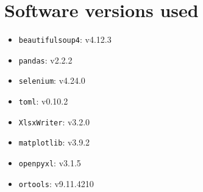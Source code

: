 \section{Software versions used}
\begin{itemize}
    \item \texttt{beautifulsoup4}: v4.12.3
    \item \texttt{pandas}: v2.2.2
    \item \texttt{selenium}: v4.24.0
    \item \texttt{toml}: v0.10.2
    \item \texttt{XlsxWriter}: v3.2.0
    \item \texttt{matplotlib}: v3.9.2
    \item \texttt{openpyxl}: v3.1.5
    \item \texttt{ortools}: v9.11.4210
\end{itemize}